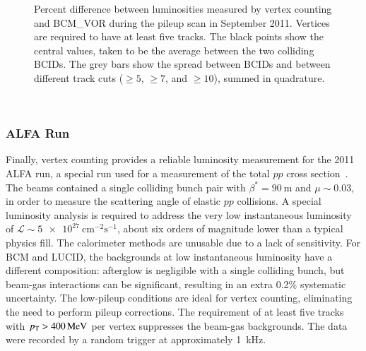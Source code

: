 \begin{figure}[htbp]
	\centering
	\caption{Percent difference between luminosities measured by vertex counting and BCM\_VOR during the pileup scan in September 2011. Vertices are required to have at least five tracks. The black points show the central values, taken to be the average between the two colliding BCIDs. The grey bars show the spread between BCIDs and between different track cuts ($\geq5$, $\geq7$, and $\geq10$), summed in quadrature.}
	\label{fig:luminosity-vertexing-muscan}
\end{figure}

\ 

\subsubsection{ALFA Run}

Finally, vertex counting provides a reliable luminosity measurement for the 2011 ALFA run, a special run used for a measurement of the total $pp$ cross section~\cite{TheATLASCollaboration:2014joa}. The beams contained a single colliding bunch pair with $\beta^{*}=\SI{90}{\meter}$ and $\mu\sim0.03$, in order to measure the scattering angle of elastic $pp$ collisions. A special luminosity analysis is required to address the very low instantaneous luminosity of $\mathcal{L}\sim\SI[per-mode=symbol]{5e27}{\centi\meter\tothe{-2}\second\tothe{-1}}$, about six orders of magnitude lower than a typical physics fill. The calorimeter methods are unusable due to a lack of sensitivity. For BCM and LUCID, the backgrounds at low instantaneous luminosity have a different composition: afterglow is negligible with a single colliding bunch, but beam-gas interactions can be significant, resulting in an extra 0.2\% systematic uncertainty. The low-pileup conditions are ideal for vertex counting, eliminating the need to perform pileup corrections. The requirement of at least five tracks with $p_{\text{T}}>\SI{400}{\mega\electronvolt}$ per vertex suppresses the beam-gas backgrounds. The data were recorded by a random trigger at approximately \SI{1}{\kilo\hertz}. 

